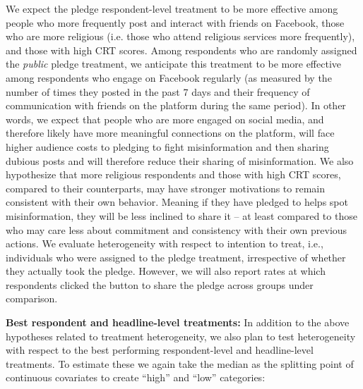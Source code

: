 \documentclass[letterpaper, 12pt, parskip=full,DIV=10]{scrartcl}
\begin{document}
We expect the pledge respondent-level treatment to be more effective among people who more frequently post and interact with friends on Facebook, those who are more religious (i.e. those who attend religious services more frequently), and those with high CRT scores. Among respondents who are randomly assigned the \textit{public} pledge treatment, we anticipate this treatment to be more effective among respondents who engage on Facebook regularly (as measured by the number of times they posted in the past 7 days and their frequency of communication with friends on the platform during the same period). In other words, we expect that people who are more engaged on social media, and therefore likely have more meaningful connections on the platform, will face higher audience costs to pledging to fight misinformation and then sharing dubious posts and will therefore reduce their sharing of misinformation. We also hypothesize that more religious respondents and those with high CRT scores, compared to their counterparts, may have stronger motivations to remain consistent with their own behavior. Meaning if they have pledged to helps spot misinformation, they will be less inclined to share it -- at least compared to those who may care less about commitment and consistency with their own previous actions. We evaluate heterogeneity with respect to intention to treat, i.e., individuals who were assigned to the pledge treatment, irrespective of whether they actually took the pledge. However, we will also report rates at which respondents clicked the button to share the pledge across groups under comparison.








\textbf{Best respondent and headline-level treatments:} In addition to the above hypotheses related to treatment heterogeneity, we also plan to test heterogeneity with respect to the best performing respondent-level and headline-level treatments. To estimate these we again take the median as the splitting point of continuous covariates to create ``high'' and ``low'' categories: 
\end{document}

